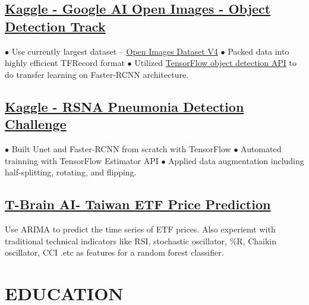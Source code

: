 \documentclass[11pt,a4paper]{moderncv}
\begin{document}
\subsection{\href{https://www.kaggle.com/c/google-ai-open-images-object-detection-track}{Kaggle - Google AI Open Images - Object Detection Track}}
{\footnotesize{$\bullet$ Use currently largest dataset -- \href{https://storage.googleapis.com/openimages/web/index.html}{Open Images Dataset V4}  \space\space $\bullet$ Packed data into highly efficient TFRecord format
\newline $\bullet$ Utilized \href{https://github.com/tensorflow/models/tree/master/research/object_detection}{TensorFlow object detection API} to do transfer learning on Faster-RCNN architecture.}}

\subsection{\href{https://www.kaggle.com/c/rsna-pneumonia-detection-challenge}{Kaggle - RSNA Pneumonia Detection Challenge}}
{\footnotesize{$\bullet$ Built Unet and Faster-RCNN from scratch with TensorFlow \space\space $\bullet$ Automated trainning with TensorFlow Estimator API
\newline $\bullet$ Applied data augmentation including half-splitting, rotating, and flipping.}}

\subsection{\href{https://tbrain.trendmicro.com.tw/Competitions/Details/2}{T-Brain AI- Taiwan ETF Price Prediction}}
{\footnotesize{Use ARIMA to predict the time series of ETF prices. Also experiemt with traditional technical indicators like RSI, stochastic oscillator, \%R, Chaikin oscillator, CCI .etc as features for a random forest classifier.}}
\vspace{-0.7\baselineskip}

\section{EDUCATION}
\vspace{-0.7\baselineskip}
\end{document}
